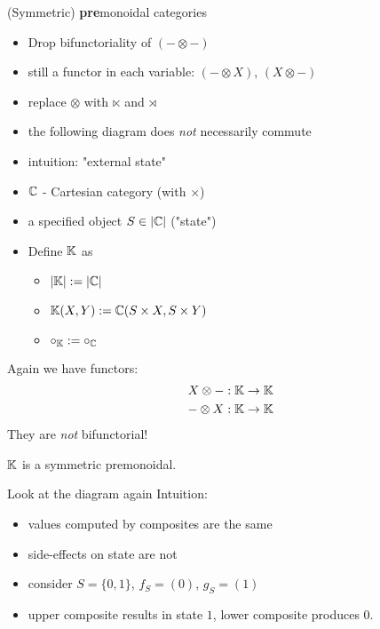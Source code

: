 \begin{frame}
    \begin{center}\LARGE (Symmetric) {\bf pre}monoidal categories\end{center}
    \begin{itemize}
        \item Drop bifunctoriality of $(- \otimes -)$
        \item still a functor in each variable: $(- \otimes X)$, $(X \otimes -)$
        \item replace $\otimes$ with $\ltimes$ and $\rtimes$
        \item the following diagram does \emph{not} necessarily commute
        \binoidaldiag
        \item intuition: "external state"
    \end{itemize}
\end{frame}

\begin{frame}
\begin{example}
    \begin{itemize}
        \item $\mathbb{C}$ - Cartesian category (with $\times$)
        \item a specified object $S \in |\mathbb{C}|$ ("state")
        \item Define $\mathbb{K}$ as
        \begin{itemize}
            \item $|\mathbb{K}| := |\mathbb{C}|$
            \item $\mathbb{K}(X, Y) := \mathbb{C}(S \times X, S \times Y)$
            \item $\circ_{\mathbb{K}} := \circ_{\mathbb{C}}$
        \end{itemize}
    \end{itemize}
    Again we have functors:
    \begin{align*}
    X \otimes -: \mathbb{K} \to \mathbb{K} \\
    - \otimes X: \mathbb{K} \to \mathbb{K}
    \end{align*}
    They are \emph{not} bifunctorial!

    $\mathbb{K}$ is a symmetric premonoidal.
\end{example}
\end{frame}

\begin{frame}
\begin{example}[continued]
    Look at the diagram again
    \binoidaldiag
    Intuition:
    \begin{itemize}
        \item values computed by composites are the same
        \item side-effects on state are not
        \item consider $S = \{0, 1\}$, $f_S = (0)$, $g_S = (1)$
        \item upper composite results in state $1$, lower composite produces $0$.
    \end{itemize}
\end{example}
\end{frame}

